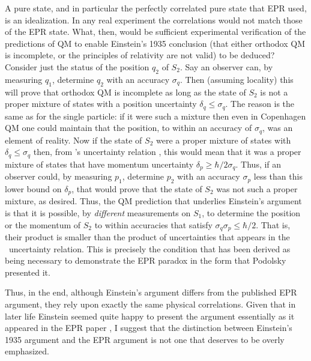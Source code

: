 \documentclass[12pt]{iopart}
\begin{document}
\begin{appendix}
A pure state, and in particular the perfectly correlated pure state that EPR used, is an idealization. In any real experiment the correlations would not match those of the EPR state. What, then, would be sufficient experimental verification of the predictions of QM to enable Einstein's 1935 conclusion (that 
either orthodox QM is incomplete, or the principles of relativity are not valid) to be deduced? 
Consider just the status of the position $q_2$ of $S_2$. Say an observer can, by measuring $q_1$, determine $q_2$ with an accuracy $\sigma_q$. Then (assuming locality) this will prove that orthodox QM is incomplete as long as the state of $S_2$ is not a proper mixture of states with a position uncertainty $\delta_q \leq \sigma_q$. The reason is the same as for the single particle: if it were such a mixture then even in Copenhagen QM one could maintain that the position, to within an accuracy of $\sigma_q$, was an element of reality. Now if the state of $S_2$ were a proper mixture of states with $\delta_q \leq \sigma_q$ then, from \hei's uncertainty relation \cite{Hei27}, this would mean that it was a proper mixture of states that have momentum uncertainty $\delta_p \geq \hbar/2\sigma_q$. Thus, if an observer could, by measuring $p_1$, determine $p_2$ with an accuracy $\sigma_p$ less than this lower bound on $\delta_p$, that would prove that the state of $S_2$ was not such a proper mixture, as desired. Thus, the QM prediction that underlies Einstein's argument is that it is possible, by {\em different} measurements on $S_1$, to determine the position or the momentum of $S_2$ to within accuracies that satisfy $\sigma_q\sigma_p \leq \hbar/2$. That is, their product is smaller than the product of uncertainties that appears in the \hei\ uncertainty relation. This is precisely the condition that has been derived as being necessary to demonstrate the EPR paradox \cite{Rei89} in the form that Podolsky presented it. 

Thus, in the end, although Einstein's argument differs from the published EPR argument, they rely upon exactly the same physical correlations. Given that in later life Einstein seemed quite happy to present the argument essentially as it appeared in the EPR paper \cite{Ein46}, I suggest that the distinction between Einstein's 1935 argument and the EPR argument is not one that deserves to be overly emphasized.

\end{appendix}
\end{document}
